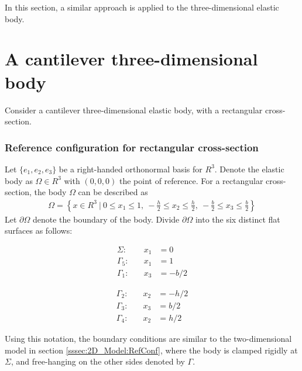 \documentclass[../../main.tex]{subfiles}
\begin{document}
In this section, a similar approach is applied to the three-dimensional elastic body.


\section{A cantilever three-dimensional body}\label{sec:FEM:3D}
Consider a cantilever three-dimensional elastic body, with a rectangular cross-section.
 
\subsubsection{Reference configuration for rectangular cross-section}
Let $\{e_1,e_2,e_3\}$ be a right-handed orthonormal basis for $R^3$. Denote the elastic body as $\Omega \in R^3$ with $(0,0,0)$ the point of reference. For a rectangular cross-section, the body $\Omega$ can be described as
\begin{eqnarray*}
	\Omega = \left\{ x \in R^3 \ | \ 0 \leq x_1 \leq 1, \ -\frac{h}{2} \leq x_2 \leq \frac{h}{2} , \ -\frac{b}{2} \leq x_3 \leq \frac{b}{2}\right \}
\end{eqnarray*} \label{sym:width}
Let $\partial \Omega$ denote the boundary of the body. Divide $\partial \Omega$ into the six distinct flat surfaces as follows:

\noindent\begin{minipage}{.5\linewidth}
	\begin{eqnarray*}
		\Sigma:& \quad x_1 &= 0\\
		\Gamma_5:& \quad x_1 &= 1\\
		\Gamma_1:& \quad x_3 &= -{b}/{2} 
	\end{eqnarray*}
\end{minipage}%
\begin{minipage}{.5\linewidth}
	\begin{eqnarray*}
		\Gamma_2:& \quad x_2 &= -{h}/{2}\\
		\Gamma_3:& \quad x_3 &= {b}/{2}\\
		\Gamma_4:& \quad x_2 &= {h}/{2} 
	\end{eqnarray*}
\end{minipage}

Using this notation, the boundary conditions are similar to the two-dimensional model in section \ref{sssec:2D_Model:RefConf}, where the body is clamped rigidly at $\Sigma$, and free-hanging on the other sides denoted by $\Gamma$.
\end{document}
